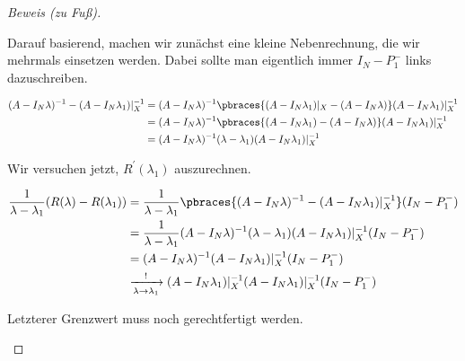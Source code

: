 \begin{proof}[Beweis (zu Fuß)]
\begin{enumerate}[label = (\roman*)]
        Darauf basierend, machen wir zunächst eine kleine Nebenrechnung, die wir mehrmals einsetzen werden.
        Dabei sollte man eigentlich immer $I_N - P_1^-$ links dazuschreiben.

        \begin{align*}
            (A - I_N \lambda)^{-1}
            -
            (A - I_N \lambda_1) |_X^{-1}
            & =
            (A - I_N \lambda)^{-1}
            \pbraces
            {
                (A - I_N \lambda_1) |_X
                -
                (A - I_N \lambda)
            }
            (A - I_N \lambda_1) |_X^{-1} \\
            & =
            (A - I_N \lambda)^{-1}
            \pbraces
            {
                (A - I_N \lambda_1)
                -
                (A - I_N \lambda)
            }
            (A - I_N \lambda_1) |_X^{-1} \\
            & =
            (A - I_N \lambda)^{-1}
            (\lambda - \lambda_1)
            (A - I_N \lambda_1) |_X^{-1}
        \end{align*}

        Wir versuchen jetzt, $R^\prime(\lambda_1)$ auszurechnen.

        \begin{align*}
            \frac{1}{\lambda - \lambda_1}
            (R(\lambda) - R(\lambda_1))
            & =
            \frac{1}{\lambda - \lambda_1}
            \pbraces
            {
                (A - I_N \lambda)^{-1}
                -
                (A - I_N \lambda_1) |_X^{-1}
            }
            (I_N - P_1^-) \\
            & =
            \frac{1}{\lambda - \lambda_1}
            (A - I_N \lambda)^{-1}
            (\lambda - \lambda_1)
            (A - I_N \lambda_1) |_X^{-1}
            (I_N - P_1^-) \\
            & =
            (A - I_N \lambda)^{-1}
            (A - I_N \lambda_1) |_X^{-1}
            (I_N - P_1^-) \\
            & \xrightarrow[\lambda \to \lambda_1]{!}
            (A - I_N \lambda_1) |_X^{-1}
            (A - I_N \lambda_1) |_X^{-1}
            (I_N - P_1^-)
        \end{align*}

        Letzterer Grenzwert muss noch gerechtfertigt werden.


\end{enumerate}
\end{proof}
